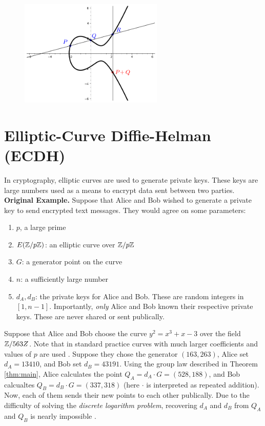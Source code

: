 \documentclass[]{math_paper}
\begin{document}
\begin{figure}[H]
    \centering
    \captionsetup{justification=centering}
    \includegraphics[height = 2in]{media/curve_4.png}
    \label{fig:curve4}
\end{figure}

\section{Elliptic-Curve Diffie-Helman (ECDH)} \label{sec:applications}
In cryptography, elliptic curves are used to generate private keys. These keys are large numbers used as a means to encrypt data sent between two parties.
\\

\noindent\textbf{Original Example.} Suppose that Alice and Bob wished to generate a private key to send encrypted text messages. They would agree on some parameters:
\begin{enumerate}
    \item $p$, a large prime
    \item $E(\mathbb{Z}/p\mathbb{Z})$: an elliptic curve over $\mathbb{Z}/p\mathbb{Z}$
    \item $G$: a generator point on the curve
    \item $n$: a sufficiently large number
    \item $d_A, d_B$: the private keys for Alice and Bob. These are random integers in $[1, n - 1]$. Importantly, \emph{only} Alice and Bob known their respective private keys. These are never shared or sent publically.
\end{enumerate}

Suppose that Alice and Bob choose the curve $y^2 = x^3 + x - 3$ over the field $\mathbb{Z}/563Z$. Note that in standard practice curves with much larger coefficients and values of $p$ are used \cite{stein2008elementary}. Suppose they chose the generator $(163, 263)$, Alice set $d_A = 13410$, and Bob set $d_B = 43191$. Using the group law described in Theorem \ref{thm:main}, Alice calculates the point $Q_A = d_A \cdot G = (528, 188)$, and Bob calcualtes $Q_B = d_B \cdot G = (337, 318)$ (here $\cdot$ is interpreted as repeated addition). Now, each of them sends their new points to each other publically. Due to the difficulty of solving the \emph{discrete logarithm problem}, recovering $d_A$ and $d_B$ from $Q_A$ and $Q_B$ is nearly impossible \cite{miller1986use}.
\end{document}

